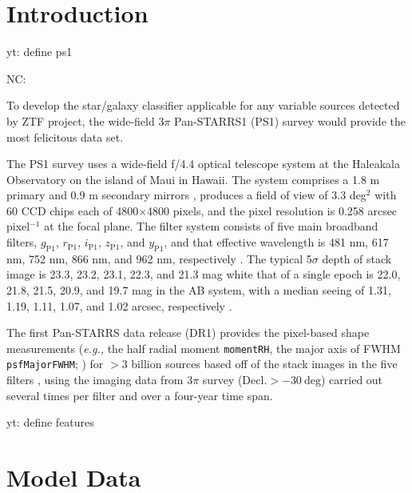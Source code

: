 \documentclass[twocolumn]{aastex62}
\newcommand{\yutaro}[1]{{\color{red} yt: {#1}}}
\newcommand{\NC}[1]{{\color{gray} NC: {#1}}}
\begin{document}

\section{Introduction}\label{sec:intro}

\yutaro{define ps1}
\NC{
To develop the star/galaxy classifier applicable for any variable sources detected by ZTF project, 
the wide-field 3$\pi$ Pan-STARRS1 (PS1) survey \citep{Chambers16} 
would provide the most felicitous data set. 

The PS1 survey uses a wide-field f/4.4 optical telescope system 
at the Haleakala Observatory on the island of Maui in Hawaii. 
The system comprises a 1.8 m primary and 0.9 m secondary mirrors \citep{Hodapp04}, 
produces a field of view of 3.3 deg$^2$ with 60 CCD chips each of 4800$\times$4800 pixels, 
and the pixel resolution is 0.258 arcsec pixel$^{-1}$ at the focal plane. 
The filter system consists of five main broadband filters, 
$g_{\mathrm{P1}}$, $r_{\mathrm{P1}}$, $i_{\mathrm{P1}}$, $z_{\mathrm{P1}}$, and $y_{\mathrm{P1}}$, 
and that effective wavelength is 481 nm, 617 nm, 752 nm, 866 nm, and 962 nm, 
respectively \citep{Tonry12, Schlafly12}. 
The typical 5$\sigma$ depth of stack image is 23.3, 23.2, 23.1, 22.3, and 21.3 mag 
white that of a single epoch is 22.0, 21.8, 21.5, 20.9, and 19.7 mag in the AB system, 
with a median seeing of 1.31, 1.19, 1.11, 1.07, and 1.02 arcsec, respectively \citep{Chambers16}. 

The first Pan-STARRS data release (DR1) provides the pixel-based shape measurements 
({\it e.g.,} the half radial moment \texttt{momentRH}, the major axis of FWHM \texttt{psfMajorFWHM}; 
\citealt{Flewelling16}) 
for $>$3 billion sources based off of the stack images in the five filters \citep{Magnier16b}, 
using the imaging data from 3$\pi$ survey ($\mathrm{Decl.}>-30\ \mathrm{deg}$) 
carried out several times per filter and over a four-year time span. 




}

\yutaro{define features}

\section{Model Data}\label{sec:model_data}
\end{document}
